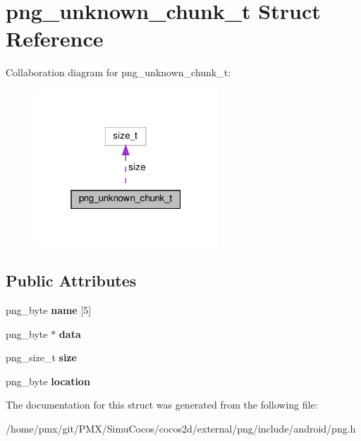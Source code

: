 \hypertarget{structpng__unknown__chunk__t}{}\section{png\+\_\+unknown\+\_\+chunk\+\_\+t Struct Reference}
\label{structpng__unknown__chunk__t}


Collaboration diagram for png\+\_\+unknown\+\_\+chunk\+\_\+t\+:
\nopagebreak
\begin{figure}[H]
\begin{center}
\leavevmode
\includegraphics[width=196pt]{structpng__unknown__chunk__t__coll__graph}
\end{center}
\end{figure}
\subsection*{Public Attributes}
\begin{DoxyCompactItemize}
\item 
\mbox{\label{structpng__unknown__chunk__t_a8248a7c49234f9dc5fa3fa16a2d3d34c}} 
png\+\_\+byte {\bfseries name} \mbox{[}5\mbox{]}
\item 
\mbox{\label{structpng__unknown__chunk__t_afac46904a501dc44f50a6cf342ad4038}} 
png\+\_\+byte $\ast$ {\bfseries data}
\item 
\mbox{\label{structpng__unknown__chunk__t_a0a691245e0c04f01ecf767f215b6a652}} 
png\+\_\+size\+\_\+t {\bfseries size}
\item 
\mbox{\label{structpng__unknown__chunk__t_af56bfc32223b97fbcb6bd29ba7a1cc29}} 
png\+\_\+byte {\bfseries location}
\end{DoxyCompactItemize}


The documentation for this struct was generated from the following file\+:\begin{DoxyCompactItemize}
\item 
/home/pmx/git/\+P\+M\+X/\+Simu\+Cocos/cocos2d/external/png/include/android/png.\+h\end{DoxyCompactItemize}
